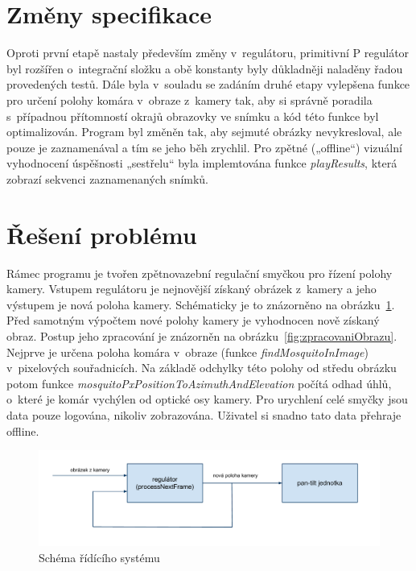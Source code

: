 \documentclass[a4paper,10pt]{article}
\begin{document}
\section{Změny specifikace}


		Oproti první etapě nastaly především změny v~regulátoru, primitivní P regulátor
		byl rozšířen o~integrační složku a obě konstanty byly důkladněji naladěny řadou
		provedených testů. Dále byla v~souladu se zadáním druhé etapy vylepšena funkce
		pro určení polohy komára v~obraze z~kamery tak, aby si správně poradila s~případnou
		přítomností okrajů obrazovky ve snímku a kód této funkce byl optimalizován.
		Program byl změněn tak, aby sejmuté obrázky nevykresloval,
		ale pouze je zaznamenával a tím se jeho běh zrychlil. Pro zpětné („offline“) vizuální 
		vyhodnocení úspěšnosti „sestřelu“ byla implemtována funkce \textit{playResults},
		která zobrazí sekvenci zaznamenaných snímků.


\section{Řešení problému}

		Rámec programu je tvořen zpětnovazební regulační smyčkou pro řízení polohy
		kamery. Vstupem regulátoru je nejnovější získaný obrázek z~kamery a jeho
		výstupem je nová poloha kamery. Schématicky je to znázorněno na
		obrázku~\ref{fig:ridiciSystem}.  Před samotným výpočtem nové polohy kamery
		je vyhodnocen nově získaný obraz. Postup jeho zpracování je znázorněn na
		obrázku~\ref{fig:zpracovaniObrazu}.  Nejprve je určena poloha komára v~obraze
		(funkce \textit{findMosquitoInImage}) v~pixelových sou\-řad\-ni\-cích. Na základě odchylky
		této polohy od středu obrázku potom funkce
		\textit{mosquito\-Px\-PositionToAzimuthAndElevation} počítá odhad úhlů, o~které je
		komár vy\-chý\-len od optické osy kamery. Pro urychlení celé smyčky jsou data pouze
		logována, nikoliv zobrazována. Uživatel si snadno tato data přehraje offline.

		\begin{figure}[!h]
			\centering
			 \includegraphics[width=1\columnwidth]{pics/schema_ridiciho_systemu}
			 \caption{Schéma řídícího systému}\label{fig:ridiciSystem}
		\end{figure}
\end{document}
